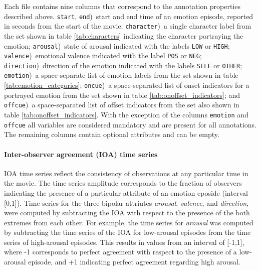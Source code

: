 Each file contains nine columns that correspond to the annotation properties
described above. \texttt{start}, \texttt{end})~start and end time of an emotion
episode, reported in seconds from the start of the movie; \texttt{character})~a
single character label from the set shown in table \ref{tab:characters}
indicating the character portraying the emotion; \texttt{arousal})~state of
arousal indicated with the labels \texttt{LOW} or \texttt{HIGH};
\texttt{valence})~emotional valence indicated with the label \texttt{POS} or
\texttt{NEG}; \texttt{direction})~direction of the emotion indicated with the
labels \texttt{SELF} or \texttt{OTHER}; \texttt{emotion})~a space-separate list
of emotion labels from the set shown in table \ref{tab:emotion_categories};
\texttt{oncue})~a space-separated list of onset indicators for a portrayed
emotion from the set shown in table \ref{tab:onoffset_indicators}; and
\texttt{offcue})~a space-separated list of offset indicators from the set also
shown in table \ref{tab:onoffset_indicators}.  With the exception of the columns
\texttt{emotion} and \texttt{offcue} all variables are considered mandatory
and are present for all annotations. The remaining columns contain optional
attributes and can be empty.

\paragraph{Inter-observer agreement (IOA) time series} IOA time series reflect
the consistency of observations at any particular time in the movie. The time
series amplitude corresponds to the fraction of observers indicating the
presence of a particular attribute of an emotion eposide (interval [0,1]). Time
series for the three bipolar attriutes \textit{arousal}, \textit{valence}, and
\textit{direction}, were computed by subtracting the IOA with respect to the
presence of the both extremes from each other.  For example, the time series
for \textit{arousal} was computed by subtracting the time series of the IOA for
low-arousal episodes from the time series of high-arousal episodes. This
results in values from an interval of [-1,1], where -1 corresponds to perfect
agreement with respect to the presence of a low-arousal episode, and +1
indicating perfect agreement regarding high arousal.

